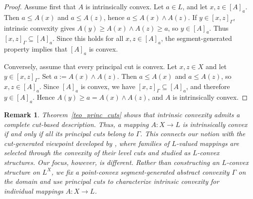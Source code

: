 \documentclass[11pt,a4paper]{article}
\newtheorem{remark}{Remark}
\begin{document}
\begin{proof}
Assume first that \(A\) is intrinsically convex. Let \(a\in L\), and let \(x,z\in[A]_a\). Then \(a\le A(x)\) and \(a\le A(z)\), hence \(a\le A(x)\wedge A(z)\). If \(y\in[x,z]_{\Gamma}\), intrinsic convexity gives \(A(y)\ge A(x)\wedge A(z)\ge a\), so \(y\in[A]_a\). Thus \([x,z]_{\Gamma}\subseteq[A]_a\). Since this holds for all \(x,z\in[A]_a\), the segment-generated property implies that \([A]_a\) is convex.

Conversely, assume that every principal cut is convex. Let \(x,z\in X\) and let \(y\in[x,z]_{\Gamma}\). Set \(a:=A(x)\wedge A(z)\). Then \(a\le A(x)\) and \(a\le A(z)\), so \(x,z\in[A]_a\). Since \([A]_a\) is convex, we have \([x,z]_{\Gamma}\subseteq[A]_a\), and therefore \(y\in[A]_a\). Hence \(A(y)\ge a=A(x)\wedge A(z)\), and \(A\) is intrinsically convex.
\end{proof}







\begin{remark}\label{rem:intrinsic-induced-L-convex}
Theorem~\ref{teo_princ_cuts} shows that intrinsic convexity admits a complete cut-based description. Thus, a mapping \(A:X\to L\) is intrinsically convex if and only if all its principal cuts belong to \(\Gamma\). This connects our notion with the cut-generated viewpoint developed by \citet[Proposition~5.2]{PangShi2017}, where families of \(L\)-valued mappings are selected through the convexity of their level cuts and studied as \(L\)-convex structures. Our focus, however, is different. Rather than constructing an \(L\)-convex structure on \(L^X\), we fix a point-convex segment-generated abstract convexity \(\Gamma\) on the domain and use principal cuts to characterize intrinsic convexity for individual mappings \(A:X\to L\).
\end{remark}





\end{document}
